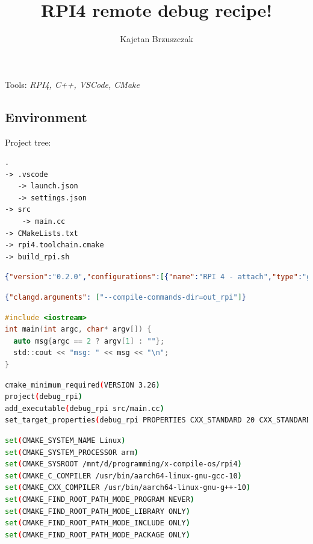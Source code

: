 \documentclass[twocolumn, 10pt]{article}
\title{RPI4 remote debug recipe!}
\author{Kajetan Brzuszczak}
\makeatletter
\renewcommand{\maketitle}{
\begin{flushleft}
{\noindent\Huge\bf\@title}\break
\end{flushleft}
}
\makeatother
\begin{document}
\maketitle

Tools: \textit{RPI4, C++, VSCode, CMake}

\subsection{Environment}
Project tree:
\begin{lstlisting}[language=txt]
.
-> .vscode
   -> launch.json
   -> settings.json
-> src
    -> main.cc
-> CMakeLists.txt
-> rpi4.toolchain.cmake
-> build_rpi.sh
\end{lstlisting}

\begin{lstlisting}[language=json,breaklines=true,caption={launch.json}]
{"version":"0.2.0","configurations":[{"name":"RPI 4 - attach","type":"gdb","target":"192.168.0.21:9999","request":"attach","remote":true,"cwd":"${workspaceRoot}","gdbpath":"gdb-multiarch","executable":"out_rpi/debug_rpi","debugger_args":["--nh","-iex","set solib-search-path /mnt/d/programming/remote_debug_rpi/out_rpi","-iex","set architecture aarch64","-iex","set sysroot /mnt/d/programming/x-compile-os/rpi4"]}]}
\end{lstlisting}

\begin{lstlisting}[language=json,breaklines=true,caption={settings.json}]
{"clangd.arguments": ["--compile-commands-dir=out_rpi"]}
\end{lstlisting}

\begin{lstlisting}[language=c,caption={main.cc}]
#include <iostream>
int main(int argc, char* argv[]) {
  auto msg{argc == 2 ? argv[1] : ""};
  std::cout << "msg: " << msg << "\n";
}
\end{lstlisting}

\begin{lstlisting}[language=sh,breaklines=true,caption={CMakeLists.txt}]
cmake_minimum_required(VERSION 3.26)
project(debug_rpi)
add_executable(debug_rpi src/main.cc)
set_target_properties(debug_rpi PROPERTIES CXX_STANDARD 20 CXX_STANDARD_REQUIRED True)
\end{lstlisting}
  
\begin{lstlisting}[language=sh,breaklines=true,caption={rpi4.toolchain.cmake}]
set(CMAKE_SYSTEM_NAME Linux)
set(CMAKE_SYSTEM_PROCESSOR arm)
set(CMAKE_SYSROOT /mnt/d/programming/x-compile-os/rpi4)
set(CMAKE_C_COMPILER /usr/bin/aarch64-linux-gnu-gcc-10)
set(CMAKE_CXX_COMPILER /usr/bin/aarch64-linux-gnu-g++-10)
set(CMAKE_FIND_ROOT_PATH_MODE_PROGRAM NEVER)
set(CMAKE_FIND_ROOT_PATH_MODE_LIBRARY ONLY)
set(CMAKE_FIND_ROOT_PATH_MODE_INCLUDE ONLY)
set(CMAKE_FIND_ROOT_PATH_MODE_PACKAGE ONLY)
\end{lstlisting}
\end{document}
